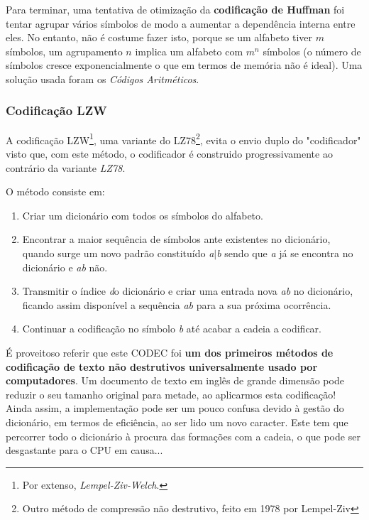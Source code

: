 \documentclass[10pt,journal,compsoc]{IEEEtran}
\begin{document}
    
    Para terminar, uma tentativa de otimização da \textbf{codificação de Huffman} foi tentar agrupar vários símbolos de modo a aumentar a dependência interna entre eles. No entanto, não é costume fazer isto, porque se um alfabeto tiver $m$ símbolos, um agrupamento $n$ implica um alfabeto com $m^n$ símbolos (o número de símbolos cresce exponencialmente o que em termos de memória não é ideal). Uma solução usada foram os \textit{Códigos Aritméticos}.
    
    
    \subsubsection{Codificação \textbf{LZW}}
    A codificação LZW\footnote{Por extenso, \textit{Lempel-Ziv-Welch}.}, uma variante do LZ78\footnote{Outro método de compressão não destrutivo, feito em 1978 por Lempel-Ziv},  evita o envio duplo do "codificador" visto que, com este método, o codificador é construido progressivamente ao contrário da variante \textit{LZ78}.
    
    O método consiste em:
    \begin{enumerate}
        \item Criar um dicionário com todos os símbolos do alfabeto. 
        \item Encontrar a maior sequência de símbolos ante existentes no dicionário, quando surge um novo padrão constituído \textit{a$|$b} sendo que \textit{a} já se encontra no dicionário e \textit{ab} não.
        \item Transmitir o índice \textit do dicionário e criar uma entrada nova \textit{ab} no dicionário, ficando assim disponível a sequência \textit{ab} para a sua próxima ocorrência.
        \item Continuar a codificação no símbolo \textit{b} até acabar a cadeia a codificar.
    \end{enumerate}
    É proveitoso referir que este CODEC foi \textbf{um dos primeiros métodos de codificação de texto não destrutivos universalmente usado por computadores}. Um documento de texto em inglês de grande dimensão pode reduzir o seu tamanho original para metade, ao aplicarmos esta codificação! Ainda assim, a implementação pode ser um pouco confusa devido à gestão do dicionário, em termos de eficiência, ao ser lido um novo caracter. Este tem que percorrer todo o dicionário à procura das formações com a cadeia, o que pode ser desgastante para o CPU em causa...
    
\end{document}

